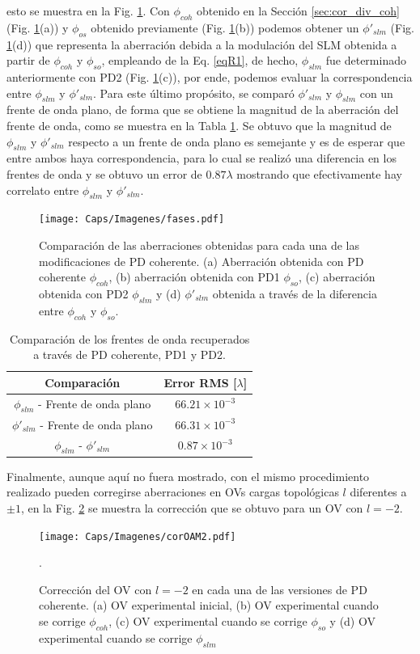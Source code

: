 esto se muestra en la Fig. \ref{fig:fases}. Con $\phi_{coh}$ obtenido en la Sección \ref{sec:cor_div_coh} (Fig. \ref{fig:fases}(a)) y $\phi_{os}$ obtenido previamente (Fig. \ref{fig:fases}(b)) podemos obtener un $\phi'_{slm}$ (Fig. \ref{fig:fases}(d)) que representa la aberración debida a la modulación del SLM obtenida a partir de $\phi_{coh}$ y $\phi_{so}$, empleando de la Eq. \ref{eqR1}, de hecho, $\phi_{slm}$ fue determinado anteriormente con PD2 (Fig. \ref{fig:fases}(c)), por ende, podemos evaluar la correspondencia entre $\phi_{slm}$ y $\phi'_{slm}$. Para este último propósito, se comparó $\phi'_{slm}$ y $\phi_{slm}$ con un frente de onda plano, de forma que se obtiene la magnitud de la aberración del frente de onda, como se muestra en la Tabla \ref{tab:compfases}. Se obtuvo que la magnitud de $\phi_{slm}$ y $\phi'_{slm}$ respecto a un frente de onda plano es semejante y es de esperar que entre ambos haya correspondencia, para lo cual se realizó una diferencia en los frentes de onda y se obtuvo un error de $0.87 \lambda$ mostrando que efectivamente hay correlato entre $\phi_{slm}$ y $\phi'_{slm}$.

\begin{figure}[!ht]
  \centering
    \texttt{[image: Caps/Imagenes/fases.pdf]}
  \caption[Comparación de las aberraciones obtenidas con PD coherente, PD1 y PD2.]{Comparación de las aberraciones obtenidas para cada una de las modificaciones de PD coherente. (a) Aberración obtenida con PD coherente $\phi_{coh}$, (b) aberración obtenida con PD1 $\phi_{so}$, (c) aberración obtenida con PD2 $\phi_{slm}$ y (d) $\phi '_{slm}$ obtenida a través de la diferencia entre $\phi_{coh}$ y $\phi_{so}$.}
  \label{fig:fases}
\end{figure}

\begin{table}[!ht]
\centering
\begin{tabular}{|c|c|}
\hline 
Comparación & Error RMS [$\lambda$] \\ 
\hline 
$\phi_{slm}$ - Frente de onda plano & $66.21\times 10^{-3} $ \\ 
\hline 
$\phi'_{slm}$ - Frente de onda plano & $66.31\times 10^{-3}$ \\ 
\hline 
$\phi_{slm}$ - $\phi'_{slm}$ & $0.87 \times 10^{-3}$ \\ 
\hline 
\end{tabular}
\caption{Comparación de los frentes de onda recuperados a través de PD coherente, PD1 y PD2.}
\label{tab:compfases}
\end{table}
%
Finalmente, aunque aquí no fuera mostrado, con el mismo procedimiento realizado pueden corregirse aberraciones en OVs cargas topológicas $l$ diferentes a $\pm 1$, en la Fig. \ref{fig:coroam2} se muestra la corrección que se obtuvo para un OV con $l=-2$.

\begin{figure}[!ht]
  \centering
    \texttt{[image: Caps/Imagenes/corOAM2.pdf]}
  \caption[Corrección de un OV con $l=-2$.]{Corrección del OV con $l=-2$ en cada una de las versiones de PD coherente. (a) OV experimental inicial, (b) OV experimental cuando se corrige $\phi_{coh}$, (c) OV experimental cuando se corrige $\phi_{so}$ y (d) OV experimental cuando se corrige $\phi_{slm}$}.
  \label{fig:coroam2}
\end{figure}